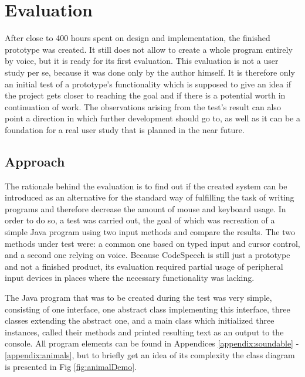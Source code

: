 \chapter{Evaluation}
\label{cha:Evaluation}



After close to 400 hours spent on design and implementation, the finished prototype was created. It still does not allow to create a whole program entirely by voice, but it is ready for its first evaluation. This evaluation is not a user study per se, because it was done only by the author himself. It is therefore only an initial test of a prototype's functionality which is supposed to give an idea if the project gets closer to reaching the goal and if there is a potential worth in continuation of work. The observations arising from the test's result can also point a direction in which further development should go to, as well as it can be a foundation for a real user study that is planned in the near future.


\section{Approach}
The rationale behind the evaluation is to find out if the created system can be introduced as an alternative for the standard way of fulfilling the task of writing programs and therefore decrease the amount of mouse and keyboard usage. In order to do so, a test was carried out, the goal of which was recreation of a simple Java program using two input methods and compare the results. The two methods under test were: a common one based on typed input and cursor control, and a second one relying on voice. Because CodeSpeech is still just a prototype and not a finished product, its evaluation required partial usage of peripheral input devices in places where the necessary functionality was lacking. 

The Java program that was to be created during the test was
very simple, consisting of one interface, one abstract class implementing this interface, three classes extending the abstract one, and a main class which initialized three instances, called their methods and printed resulting text as an output to the console. All program elements can be found in Appendices \ref{appendix:soundable} - \ref{appendix:animals}, but to briefly get an idea of its complexity the class diagram is presented in Fig \ref{fig:animalDemo}. 

